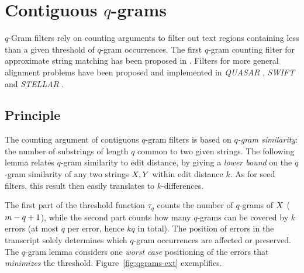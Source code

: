 




\section{Contiguous $q$-grams}
\label{sec:filtering:qgrams-ext}

$q$-Gram filters rely on counting arguments to filter out text regions containing less than a given threshold of $q$-gram occurrences.
The first $q$-gram counting filter for approximate string matching has been proposed in \citep{Jokinen1991}.
Filters for more general alignment problems have been proposed and implemented in \emph{QUASAR} \citep{Burkhardt1999}, \emph{SWIFT} \citep{Rasmussen2006} and \emph{STELLAR} \citep{Kehr2011}.

\subsection{Principle}

The counting argument of contiguous $q$-gram filters is based on \emph{$q$-gram similarity}: the number of substrings of length $q$ common to two given strings.
The following lemma relates $q$-gram similarity to edit distance, by giving a \emph{lower bound} on the $q$-gram similarity of any two strings $X,Y$ within edit distance $k$.
As for seed filters, this result then easily translates to $k$-differences.

The first part of the threshold function $\tau_q$ counts the number of $q$-grams of $X$ (\ie $m - q + 1$), while the second part counts how many $q$-grams can be covered by $k$ errors (\ie at most $q$ per error, hence $kq$ in total).
The position of errors in the transcript solely determines which $q$-gram occurrences are affected or preserved.
The $q$-gram lemma considers one \emph{worst case} positioning of the errors that \emph{minimizes} the threshold.
Figure~\ref{fig:qgrams-ext} exemplifies.

